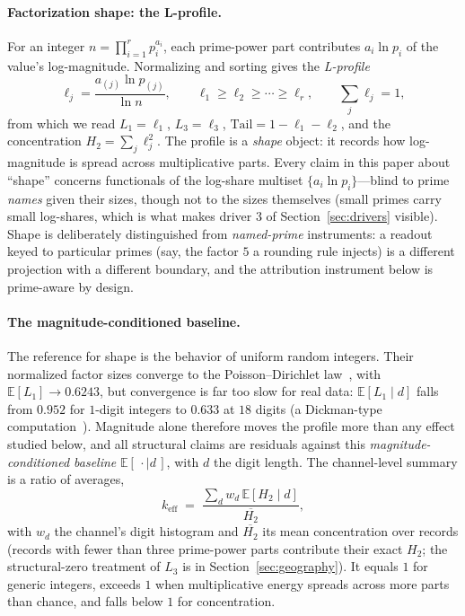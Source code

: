 \documentclass[12pt]{article}
\newcommand{\keff}{k_{\mathrm{eff}}}
\begin{document}
\paragraph{Factorization shape: the L-profile.}
For an integer $n = \prod_{i=1}^{r} p_i^{a_i}$, each prime-power part
contributes $a_i \ln p_i$ of the value's log-magnitude. Normalizing and
sorting gives the \emph{L-profile}
\begin{equation}
\ell_j = \frac{a_{(j)} \ln p_{(j)}}{\ln n}, \qquad
\ell_1 \ge \ell_2 \ge \cdots \ge \ell_r, \qquad \textstyle\sum_j \ell_j = 1,
\label{eq:lprofile}
\end{equation}
from which we read $L_1 = \ell_1$, $L_3 = \ell_3$,
$\mathrm{Tail} = 1 - \ell_1 - \ell_2$, and the concentration
$H_2 = \sum_j \ell_j^2$. The profile is a \emph{shape} object: it records how
log-magnitude is spread across multiplicative parts. Every claim in this
paper about ``shape'' concerns functionals of the log-share multiset
$\{a_i \ln p_i\}$---blind to prime \emph{names} given their sizes, though
not to the sizes themselves (small primes carry small log-shares, which is
what makes driver 3 of Section~\ref{sec:drivers} visible). Shape is
deliberately distinguished from \emph{named-prime} instruments: a readout
keyed to particular primes (say, the factor $5$ a rounding rule injects) is a
different projection with a different boundary, and the attribution
instrument below is prime-aware by design.

\paragraph{The magnitude-conditioned baseline.}
The reference for shape is the behavior of uniform random integers. Their
normalized factor sizes converge to the Poisson--Dirichlet
law~\citep{billingsley1972,kingman1975,arratia2000}, with
$\mathbb{E}[L_1] \to 0.6243$, but convergence is far too slow for real data:
$\mathbb{E}[L_1 \mid d]$ falls from $0.952$ for $1$-digit integers to $0.633$
at $18$ digits (a Dickman-type computation~\citep{dickman1930}). Magnitude
alone therefore moves the profile more than any effect studied below, and all
structural claims are residuals against this \emph{magnitude-conditioned
baseline} $\mathbb{E}[\,\cdot \mid d\,]$, with $d$ the digit length. The
channel-level summary is a ratio of averages,
\begin{equation}
\keff \;=\; \frac{\sum_d w_d\, \mathbb{E}[H_2 \mid d]}{\overline{H_2}},
\label{eq:keff}
\end{equation}
with $w_d$ the channel's digit histogram and $\overline{H_2}$ its mean
concentration over records (records with fewer than three prime-power parts
contribute their exact $H_2$; the structural-zero treatment of $L_3$ is in
Section~\ref{sec:geography}). It equals $1$ for generic integers, exceeds
$1$ when multiplicative energy spreads across more parts than chance, and
falls below $1$ for concentration.
\end{document}
